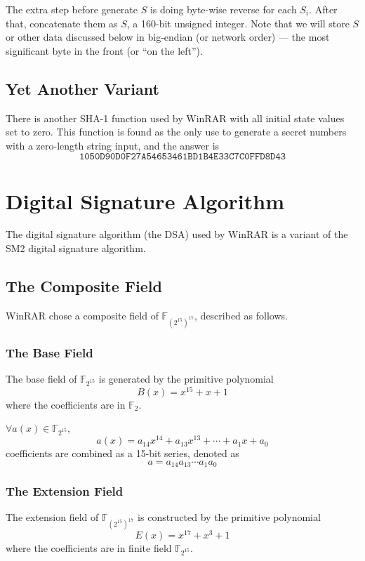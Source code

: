 \documentclass[oneside]{article}
\begin{document}
The extra step before generate $S$ is doing byte-wise reverse for each $S_i$.
After that, concatenate them as $S$, a 160-bit unsigned integer.
Note that we will store $S$ or other data discussed below in big-endian (or network order) --- the most significant byte in the front (or ``on the left'').

\subsection{Yet Another Variant}\label{YA-SHA-1}
There is another SHA-1 function used by WinRAR with all initial state values set to zero.
This function is found as the only use to generate a secret numbers with a zero-length string input, and the answer is
\[\mathtt{1050D90D0F27A54653461BD1B4E33C7C0FFD8D43}\]

\section{Digital Signature Algorithm}
The digital signature algorithm (the DSA) used by WinRAR is a variant of the SM2 digital signature algorithm.

\subsection{The Composite Field}
WinRAR chose a composite field of $\mathbb{F}_{\left(2^{15}\right)^{17}}$, described as follows.

\subsubsection{The Base Field}
The base field of $\mathbb{F}_{2^{15}}$ is generated by the primitive polynomial
\[B\left(x\right)=x^{15}+x+1\]
where the coefficients are in $\mathbb{F}_{2}$.

$\forall a\left(x\right)\in\mathbb{F}_{2^{15}}$,
\[a\left(x\right)=a_{14}x^{14}+a_{13}x^{13}+\cdots+a_1x+a_0\]
coefficients are combined as a 15-bit series, denoted as
\[a=a_{14}a_{13}\cdots a_1a_0\]

\subsubsection{The Extension Field}
The extension field of $\mathbb{F}_{\left(2^{15}\right)^{17}}$ is constructed by the primitive polynomial
\[E\left(x\right)=x^{17}+x^3+1\]
where the coefficients are in finite field $\mathbb{F}_{2^{15}}$.
\end{document}
